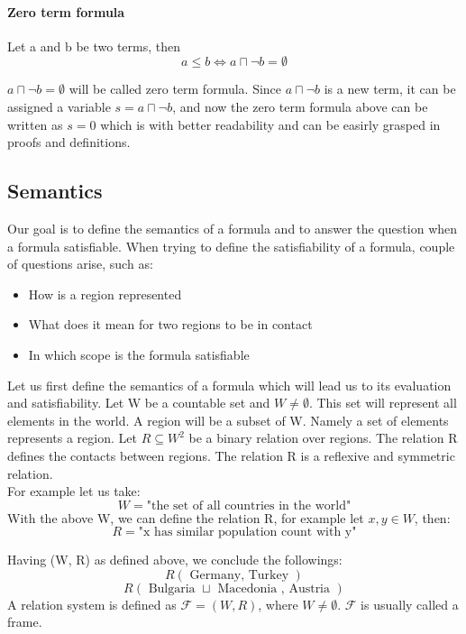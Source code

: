 \documentclass{article}
\begin{document}
	\paragraph{Zero term formula}
		Let a and b be two terms, then
		\begin{equation}
			a \le b \iff a \sqcap \neg b = \emptyset
		\end{equation}

		$a \sqcap \neg b = \emptyset$ will be called zero term formula.
		Since $a \sqcap \neg b$ is a new term, it can be assigned a variable $s = a \sqcap \neg b$, 
		and now the zero term formula above can be written as $s  = 0$ which is with better readability and 
		can be easirly grasped in proofs and definitions.


	\subsection{Semantics}
Our goal is to define the semantics of a formula and to answer the question when a formula satisfiable.
When trying to define the satisfiability of a formula, couple of questions arise, such as:
		\begin{itemize}
			\item How is a region represented 
			\item What does it mean for two regions to be in contact
			\item In which scope is the formula satisfiable
		\end{itemize}
Let us first define the semantics of a formula which will lead us to its evaluation and satisfiability.
\newline
Let W be a countable set and $W \neq \emptyset$. This set will represent all elements in the world.
A region will be a subset of W. Namely a set of elements represents a region.
Let $R \subseteq W^2$ be a binary relation over regions. The relation R defines the contacts between regions.
The relation R is a reflexive and symmetric relation. \\
For example let us take:
		\begin{equation*}
			W = \text{"the set of all countries in the world"}
		\end{equation*}
With the above W, we can define the relation R, for example let $x, y \in W$, then:
		\begin{equation*}
			R = \text{"x has similar population count with y"}
		\end{equation*}

Having (W, R) as defined above, we conclude the followings: 
		\begin{equation*}
			R(\text{ Germany, Turkey })
		 \end{equation*}
		\begin{equation*}
			R(\text{ Bulgaria } \sqcup \text{ Macedonia , Austria })
		 \end{equation*}
A relation system is defined as $\mathcal{F} = (W, R)$, where $W \neq \emptyset$. $\mathcal{F}$ is usually called a frame.
\end{document}
